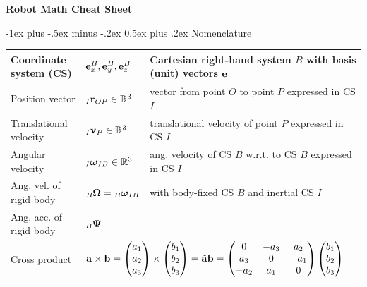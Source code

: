 \documentclass[10pt,landscape,a4paper]{article}
\makeatletter
\renewcommand{\section}{\@startsection{section}{1}{0mm}%
                                {-1ex plus -.5ex minus -.2ex}%
                                {0.5ex plus .2ex}%
                                {\normalfont\large\bfseries}}
\makeatother
\begin{document}
\raggedright
\footnotesize
\begin{multicols}{2}


\setlength{\premulticols}{1pt}
\setlength{\postmulticols}{1pt}
\setlength{\multicolsep}{1pt}
\setlength{\columnsep}{2pt}

\begin{center}
     \Large{\textbf{Robot Math Cheat Sheet}} \\
\end{center}
\section{Nomenclature }
\begin{tabular}{|l|l|l|}
\hline
Coordinate system (CS) & ${\mathbf e_x^B,\mathbf e_y^B,\mathbf e_z^B}$ & Cartesian right-hand system $B$ with basis (unit) vectors $\mathbf e$  \\ \hline
Position vector & ${}_I\mathbf r_{OP} \in \mathbb{R}^3 $ & vector from point $O$ to point $P$ expressed in CS $I$ \\ \hline 
Translational velocity & ${}_I\mathbf v_P \in \mathbb{R}^3 $  & translational velocity of point $P$ expressed in CS $I$ \\ \hline
Angular velocity & ${}_I\mbox{\boldmath $\omega$}_{IB} \in \mathbb{R}^3 $ & ang. velocity of CS $B$ w.r.t. to CS $B$ expressed in CS $I$ \\ \hline
Ang. vel. of rigid body & ${}_B\mathbf \Omega = {}_B\mbox{\boldmath $\omega$}_{IB}$ & with body-fixed CS $B$ and inertial CS $I$ \\ \hline
Ang. acc. of rigid body & ${}_B\mathbf \Psi$ \\ \hline
Cross product & \multicolumn{2}{l|}{$\mathbf a \times \mathbf b = \begin{pmatrix} a_1 \\ a_2 \\ a_3\end{pmatrix} \times \begin{pmatrix} b_1 \\ b_2 \\ b_3\end{pmatrix} =  \tilde{\mathbf a}\mathbf b = \begin{pmatrix} 0 & -a_3 & a_2 \\ a_3 & 0 & -a_1 \\ -a_2 & a_1 & 0 \end{pmatrix} \begin{pmatrix} b_1 \\ b_2 \\ b_3\end{pmatrix}$}  \\ \hline

\end{tabular}
\end{multicols}
\end{document}
